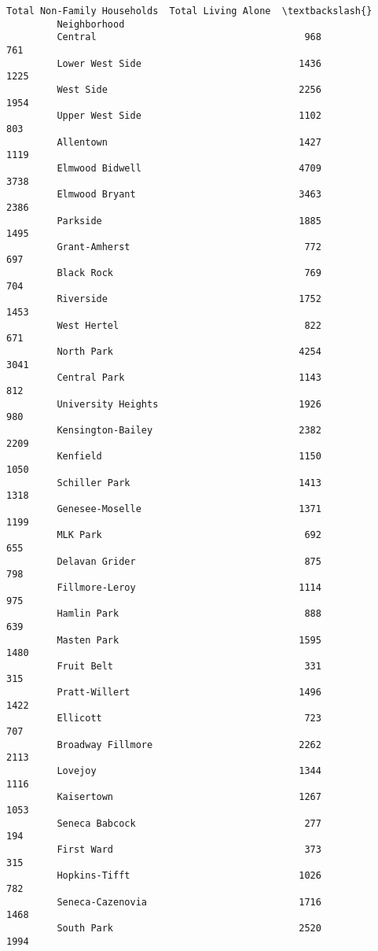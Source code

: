 \documentclass[11pt]{article}
\begin{document}
\begin{Verbatim}[commandchars=\\\{\}]
                             Total Non-Family Households  Total Living Alone  \textbackslash{}
         Neighborhood                                                          
         Central                                     968                 761   
         Lower West Side                            1436                1225   
         West Side                                  2256                1954   
         Upper West Side                            1102                 803   
         Allentown                                  1427                1119   
         Elmwood Bidwell                            4709                3738   
         Elmwood Bryant                             3463                2386   
         Parkside                                   1885                1495   
         Grant-Amherst                               772                 697   
         Black Rock                                  769                 704   
         Riverside                                  1752                1453   
         West Hertel                                 822                 671   
         North Park                                 4254                3041   
         Central Park                               1143                 812   
         University Heights                         1926                 980   
         Kensington-Bailey                          2382                2209   
         Kenfield                                   1150                1050   
         Schiller Park                              1413                1318   
         Genesee-Moselle                            1371                1199   
         MLK Park                                    692                 655   
         Delavan Grider                              875                 798   
         Fillmore-Leroy                             1114                 975   
         Hamlin Park                                 888                 639   
         Masten Park                                1595                1480   
         Fruit Belt                                  331                 315   
         Pratt-Willert                              1496                1422   
         Ellicott                                    723                 707   
         Broadway Fillmore                          2262                2113   
         Lovejoy                                    1344                1116   
         Kaisertown                                 1267                1053   
         Seneca Babcock                              277                 194   
         First Ward                                  373                 315   
         Hopkins-Tifft                              1026                 782   
         Seneca-Cazenovia                           1716                1468   
         South Park                                 2520                1994   
         

\end{Verbatim}
\end{document}
